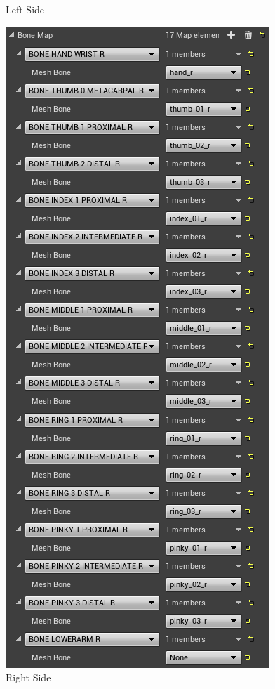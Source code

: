 \begin{table}[!htb]
\begin{minipage}{\linewidth}
\begin{subfigure}{0.49\textwidth}
            \caption{Left Side}
        \end{subfigure}
        \begin{subfigure}{0.49\textwidth}
            \includegraphics[width=\textwidth]{figures/mappedBonesR.png}
            \centering
            \caption{Right Side}
        \end{subfigure}
        \label{fig:mappedBones}
	\end{minipage}
\end{table}

